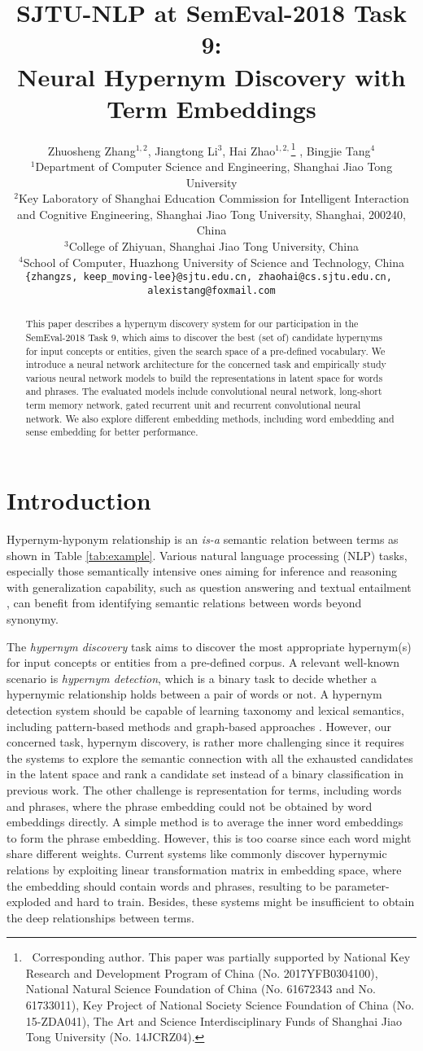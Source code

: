 \documentclass[11pt,a4paper]{article}
\title{SJTU-NLP at SemEval-2018 Task 9: \\ Neural Hypernym Discovery with Term Embeddings}
\author{Zhuosheng Zhang$^{1,2}$, Jiangtong Li$^{3}$, Hai Zhao$^{1,2,}$\thanks{$\ $ Corresponding author. This paper was partially supported by
		National Key Research and Development Program of China (No. 2017YFB0304100),
		National Natural Science Foundation of China (No. 61672343 and No. 61733011),
		Key Project of National Society Science Foundation of China (No. 15-ZDA041),
		The Art and Science Interdisciplinary Funds of Shanghai Jiao Tong University (No. 14JCRZ04).} , Bingjie Tang$^{4}$  \\
	$^{1}$Department of Computer Science and Engineering, Shanghai Jiao Tong University \\
	$^{2}$Key Laboratory of Shanghai Education Commission for Intelligent Interaction \\ and Cognitive Engineering, Shanghai Jiao Tong University, Shanghai, 200240, China\\
	$^{3}$College of Zhiyuan, Shanghai Jiao Tong University, China\\
	$^{4}$School of Computer, Huazhong University of Science and Technology, China\\
	{\tt \{zhangzs, keep\_moving-lee\}@sjtu.edu.cn, zhaohai@cs.sjtu.edu.cn, } \\ {\tt alexistang@foxmail.com}
}
\begin{document}
	\maketitle
	\begin{abstract}
	This paper describes a hypernym discovery system for our participation in the SemEval-2018 Task 9, which aims to discover the best (set of) candidate hypernyms for input concepts or entities, given the search space of a pre-defined vocabulary. We introduce a neural network architecture for the concerned task and empirically study various neural network models to build the representations in latent space for words and phrases. The evaluated models include convolutional neural network, long-short term memory network, gated recurrent unit and recurrent convolutional neural network. We also explore different embedding methods, including word embedding and sense embedding for better performance.  
	\end{abstract}
	
	
	\section{Introduction}
	
	Hypernym-hyponym relationship is an \emph{is-a} semantic relation between terms as shown in Table \ref{tab:example}. Various natural language processing (NLP) tasks, especially those semantically intensive ones aiming for inference and reasoning with generalization capability, such as question answering \cite{Harabagiu2006Methods, Yahya2013Robust} and textual entailment \cite{Dagan2013Recognizing,Roller2016Relations}, can benefit from identifying semantic relations between words beyond synonymy.
	
	The \emph{hypernym discovery} task \cite{semeval2018task9} aims to discover the most appropriate hypernym(s) for input concepts or entities from a pre-defined corpus. A relevant well-known scenario is \emph{hypernym detection}, which is a binary task to decide whether a hypernymic relationship holds between a pair of words or not. A hypernym detection system should be capable of learning taxonomy and lexical semantics, including pattern-based methods \cite{Boella2013Supervised,Espinosa2016ExTaSem} and graph-based approaches \cite{Fountain2012Taxonomy,Velardi2013OntoLearn,Kang2016TaxoFinder}. However, our concerned task, hypernym discovery, is rather more challenging since it requires the systems to explore the semantic connection with all the exhausted candidates in the latent space and rank a candidate set instead of a binary classification in previous work. The other challenge is representation for terms, including words and phrases, where the phrase embedding could not be obtained by word embeddings directly. A simple method is to average the inner word embeddings to form the phrase embedding. However, this is too coarse since each word might share different weights. Current systems like \cite{Espinosa2016Supervised} commonly discover hypernymic relations by exploiting linear transformation matrix in embedding space, where the embedding should contain words and phrases, resulting to be parameter-exploded and hard to train. Besides, these systems might be insufficient to obtain the deep relationships between terms. 
	
\end{document}
